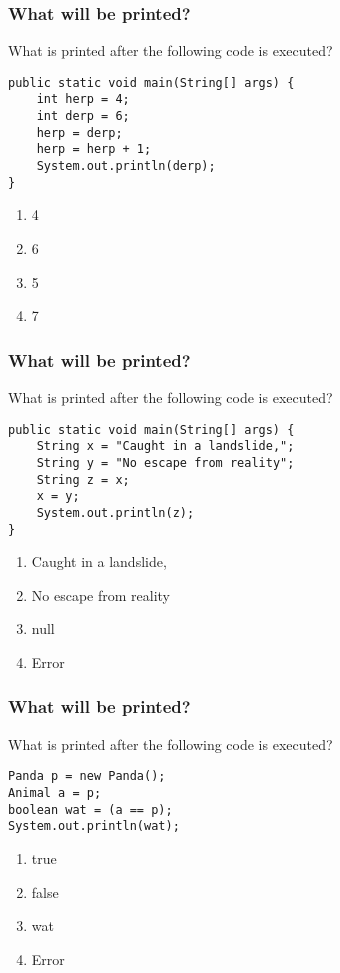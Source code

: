 \documentclass[9pt]{beamer}
\begin{document}
\begin{frame}[fragile]
  \frametitle{What will be printed?}
  What is printed after the following code is executed?
  \begin{lstlisting}
public static void main(String[] args) {
    int herp = 4;
    int derp = 6;
    herp = derp;
    herp = herp + 1;
    System.out.println(derp);
}
  \end{lstlisting}
  \begin{enumerate}
    \item
      4
    \item
      \alert<2>{6}
    \item
      5
    \item
      7
  \end{enumerate}
\end{frame}

\begin{frame}[fragile]
  \frametitle{What will be printed?}
  What is printed after the following code is executed?
  \begin{lstlisting}
public static void main(String[] args) {
    String x = "Caught in a landslide,";
    String y = "No escape from reality";
    String z = x;
    x = y;
    System.out.println(z);
}
  \end{lstlisting}
  \begin{enumerate}
    \item
      \alert<2>{Caught in a landslide,}
    \item
      No escape from reality
    \item
      null
    \item
      Error
  \end{enumerate}
\end{frame}

\begin{frame}[fragile]
  \frametitle{What will be printed?}
  What is printed after the following code is executed?
  \begin{lstlisting}
Panda p = new Panda();
Animal a = p;
boolean wat = (a == p);
System.out.println(wat);
  \end{lstlisting}
  \begin{enumerate}
    \item
      \alert<2>{true}
    \item
      false
    \item
      wat
    \item Error
  \end{enumerate}
\end{frame}
\end{document}

